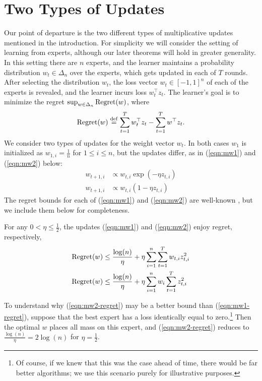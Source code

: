 \documentclass[paper_icml.tex]{subfiles}
\begin{document}
\section{Two Types of Updates} 
\label{sec:mw12}
Our point of departure is the two different types of multiplicative updates 
mentioned in the introduction. For simplicity we will consider the setting of 
learning from experts, although our later theorems will hold in greater 
generality. In this setting there are $n$ experts, and the learner maintains a 
probability distribution $w_t \in \Delta_n$ over the experts, which gets 
updated in each of $T$ rounds. After selecting the distribution $w_t$, 
the loss vector $w_t \in [-1,1]^n$ of each of the experts is revealed, and the 
learner incurs loss $w_t^{\top}z_t$. The learner's goal is to minimize 
the regret $\sup_{w \in \Delta_n} \operatorname{Regret}(w)$, where
\[ \operatorname{Regret}(w) \stackrel{\mathrm{def}}{=} \sum_{t=1}^T w_t^{\top}z_t - \sum_{t=1}^T w^{\top}z_t. \]
We consider two types of updates for the weight vector $w_t$. In both cases 
$w_1$ is initialized as $w_{1,i} = \frac{1}{n}$ for $1 \leq i \leq n$, but 
the updates differ, as in (\ref{eqn:mw1}) and (\ref{eqn:mw2}) below:
\begin{align}
\label{eqn:mw1}
w_{t+1,i} &\propto w_{t,i}\exp(-\eta z_{t,i})\\
\label{eqn:mw2}
w_{t+1,i} &\propto w_{t,i}(1-\eta z_{t,i})
\end{align}
The regret bounds for each of (\ref{eqn:mw1}) and (\ref{eqn:mw2}) are 
well-known \cite{shalev2011, cesa2007}, but we include them below for completeness.
\begin{theorem}
\label{thm:mw12}
For any $0 < \eta \leq \frac{1}{2}$, the updates (\ref{eqn:mw1}) and 
(\ref{eqn:mw2}) enjoy regret, respectively,
\begin{align}
\label{eqn:mw1-regret}
\operatorname{Regret}(w) &\leq \frac{\log(n)}{\eta} + \eta \sum_{i=1}^n \sum_{t=1}^T w_{t,i}z_{t,i}^2 \\
\label{eqn:mw2-regret}
\operatorname{Regret}(w) &\leq \frac{\log(n)}{\eta} + \eta \sum_{i=1}^n w_i \sum_{t=1}^T z_{t,i}^2
\end{align}
\end{theorem}
To understand why (\ref{eqn:mw2-regret}) may be a better bound than 
(\ref{eqn:mw1-regret}), suppose that the best expert has a loss identically 
equal to zero.\footnote{Of course, if we knew that this was the case ahead of 
time, there would be far better algorithms; we use this scenario purely for 
illustrative purposes.} Then the optimal $w$ places all mass on this expert, 
and (\ref{eqn:mw2-regret}) reduces to $\frac{\log(n)}{\eta} = 2\log(n)$ for 
$\eta = \frac{1}{2}$.
\end{document}
